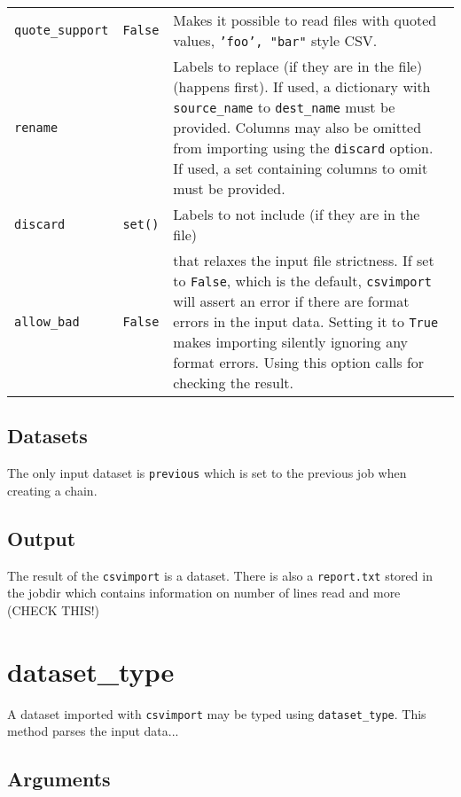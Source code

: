 \begin{tabular}{ l l p{10cm}}
  \texttt{quote\_support} & \texttt{False} & Makes it possible to read
  files with quoted values, \texttt{'foo', "bar"} style CSV.\\[1ex]

  \texttt{rename} & & Labels to replace (if they are in the file)
  (happens first). If used, a dictionary with \texttt{source\_name} to
  \texttt{dest\_name} must be provided.  Columns may also be omitted
  from importing using the \texttt{discard} option.  If used, a set
  containing columns to omit must be provided.\\[1ex]

  \texttt{discard} & \texttt{set()} &Labels to not include (if they
  are in the file)\\[1ex]

  \texttt{allow\_bad} & \texttt{False} & that relaxes the input file
  strictness.  If set to \texttt{False}, which is the default,
  \texttt{csvimport} will assert an error if there are format errors
  in the input data.  Setting it to \texttt{True} makes importing
  silently ignoring any format errors.  Using this option calls for
  checking the result.\\[1ex]
\end{tabular}


\subsection{Datasets}
The only input dataset is \texttt{previous} which is set to the
previous job when creating a chain.


\subsection{Output}
The result of the \texttt{csvimport} is a dataset.  There is also a
\texttt{report.txt} stored in the jobdir which contains information on
number of lines read and more (CHECK THIS!)






\clearpage
\section{dataset\_type}

A dataset imported with \texttt{csvimport} may be typed using
\texttt{dataset\_type}.  This method parses the input data...



\subsection{Arguments}

